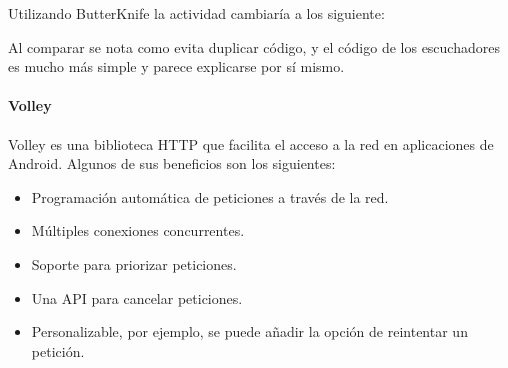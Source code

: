 Utilizando ButterKnife la actividad cambiaría a los siguiente:

%
\begin{sphinxVerbatim}[commandchars=\\\{\}]
     
   

      

     

\end{sphinxVerbatim}

Al comparar se nota como evita duplicar código, y el código de los escuchadores
es mucho más simple y parece explicarse por sí mismo.


\paragraph{Volley}
\label{\detokenize{dev_docs:volley}}
Volley es una biblioteca HTTP que facilita el acceso a la red en aplicaciones
de Android. Algunos de sus beneficios son los siguientes:
\begin{itemize}
\item {} 
Programación automática de peticiones a través de la red.

\item {} 
Múltiples conexiones concurrentes.

\item {} 
Soporte para priorizar peticiones.

\item {} 
Una API para cancelar peticiones.

\item {} 
Personalizable, por ejemplo, se puede añadir la opción de reintentar un petición.

\end{itemize}


